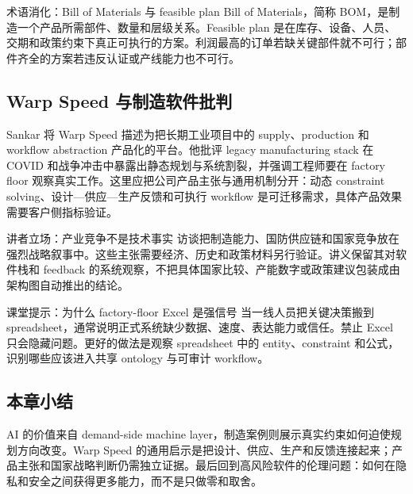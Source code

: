 \begin{importantbox}{术语消化：Bill of Materials 与 feasible plan}
Bill of Materials，简称 BOM，是制造一个产品所需部件、数量和层级关系。Feasible plan 是在库存、设备、人员、交期和政策约束下真正可执行的方案。利润最高的订单若缺关键部件就不可行；部件齐全的方案若违反认证或产线能力也不可行。
\end{importantbox}

\subsection{Warp Speed 与制造软件批判}

Sankar 将 Warp Speed 描述为把长期工业项目中的 supply、production 和 workflow abstraction 产品化的平台。他批评 legacy manufacturing stack 在 COVID 和战争冲击中暴露出静态规划与系统割裂，并强调工程师要在 factory floor 观察真实工作。这里应把公司产品主张与通用机制分开：动态 constraint solving、设计—供应—生产反馈和可执行 workflow 是可迁移需求，具体产品效果需要客户侧指标验证。

\begin{warningbox}{讲者立场：产业竞争不是技术事实}
访谈把制造能力、国防供应链和国家竞争放在强烈战略叙事中。这些主张需要经济、历史和政策材料另行验证。讲义保留其对软件栈和 feedback 的系统观察，不把具体国家比较、产能数字或政策建议包装成由架构图自动推出的结论。
\end{warningbox}

\begin{knowledgebox}{课堂提示：为什么 factory-floor Excel 是强信号}
当一线人员把关键决策搬到 spreadsheet，通常说明正式系统缺少数据、速度、表达能力或信任。禁止 Excel 只会隐藏问题。更好的做法是观察 spreadsheet 中的 entity、constraint 和公式，识别哪些应该进入共享 ontology 与可审计 workflow。
\end{knowledgebox}

\subsection{本章小结}

AI 的价值来自 demand-side machine layer，制造案例则展示真实约束如何迫使规划方向改变。Warp Speed 的通用启示是把设计、供应、生产和反馈连接起来；产品主张和国家战略判断仍需独立证据。最后回到高风险软件的伦理问题：如何在隐私和安全之间获得更多能力，而不是只做零和取舍。

